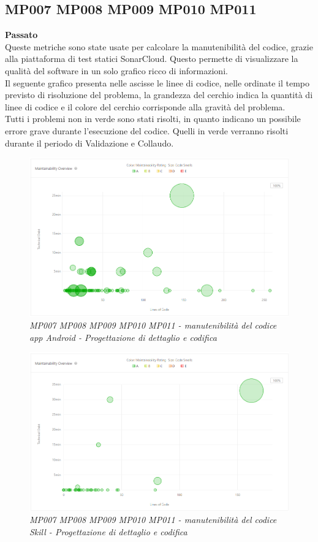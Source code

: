 \subsection{MP007 MP008 MP009 MP010 MP011 }
\textbf{Passato}\\
Queste metriche sono state usate per calcolare la manutenibilità del codice, grazie alla piattaforma di test statici SonarCloud. Questo permette di visualizzare la qualità del software in un solo grafico ricco di informazioni.\\
Il seguente grafico presenta nelle ascisse le linee di codice, nelle ordinate il tempo previsto di risoluzione del problema, la grandezza del cerchio indica la quantità di linee di codice e il colore del cerchio corrisponde alla gravità del problema.\\
Tutti i problemi non in verde sono stati risolti, in quanto indicano un possibile errore grave durante l'esecuzione del codice. Quelli in verde verranno risolti durante il periodo di Validazione e Collaudo.\\
\begin{figure} [H]
    \centering
	\includegraphics[scale=0.5]{./images/manPDC.png}
    \caption{\textit{MP007 MP008 MP009 MP010 MP011 - manutenibilità del codice app Android - Progettazione di dettaglio e codifica}}\label{}
\end{figure}
\begin{figure} [H]
    \centering
	\includegraphics[scale=0.5]{./images/manSPDC.png}
    \caption{\textit{MP007 MP008 MP009 MP010 MP011 - manutenibilità del codice Skill - Progettazione di dettaglio e codifica}}\label{}
\end{figure}

